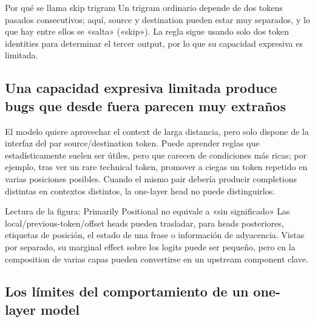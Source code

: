 \begin{importantbox}{Por qué se llama skip trigram}
Un trigram ordinario depende de dos tokens pasados consecutivos; aquí, source y destination pueden estar muy separados, y lo que hay entre ellos se «salta» («skip»). La regla sigue usando solo dos token identities para determinar el tercer output, por lo que su capacidad expresiva es limitada.
\end{importantbox}

\subsection{Una capacidad expresiva limitada produce bugs que desde fuera parecen muy extraños}

El modelo quiere aprovechar el context de larga distancia, pero solo dispone de la interfaz del par source/destination token. Puede aprender reglas que estadísticamente suelen ser útiles, pero que carecen de condiciones más ricas; por ejemplo, tras ver un rare technical token, promover a ciegas un token repetido en varias posiciones posibles. Cuando el mismo pair debería producir completions distintas en contextos distintos, la one-layer head no puede distinguirlos.




\begin{knowledgebox}{Lectura de la figura: Primarily Positional no equivale a «sin significado»}
Las local/previous-token/offset heads pueden trasladar, para heads posteriores, etiquetas de posición, el estado de una frase o información de adyacencia. Vistas por separado, su marginal effect sobre los logits puede ser pequeño, pero en la composition de varias capas pueden convertirse en un upstream component clave.
\end{knowledgebox}

\subsection{Los límites del comportamiento de un one-layer model}

